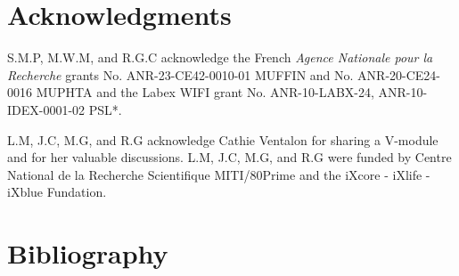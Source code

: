 \documentclass[12pt]{iopart}
\begin{document}

\section*{Acknowledgments}

\noindent 
S.M.P, M.W.M, and R.G.C acknowledge the French \textit{Agence Nationale pour la Recherche} grants No. ANR-23-CE42-0010-01 MUFFIN and No. ANR-20-CE24-0016 MUPHTA 
and the  Labex WIFI grant No. ANR-10-LABX-24, ANR-10-IDEX-0001-02 PSL*. 

L.M, J.C, M.G, and R.G acknowledge Cathie Ventalon for sharing a V-module and for her valuable discussions. L.M, J.C, M.G, and R.G were funded by Centre National de la Recherche Scientifique MITI/80Prime and the iXcore - iXlife - iXblue Fundation.

\section{Bibliography}




\end{document}
